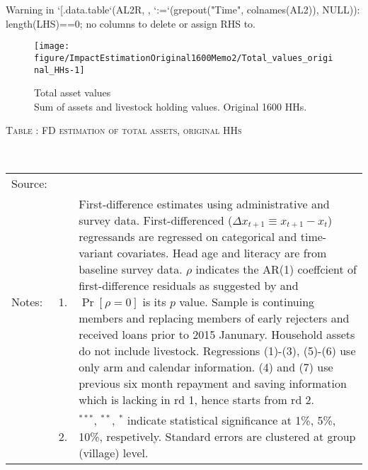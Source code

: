 \begin{Schunk}
\begin{Soutput}
Warning in `[.data.table`(AL2R, , `:=`(grepout("Time", colnames(AL2)), NULL)): length(LHS)==0; no columns to delete or assign RHS to.
\end{Soutput}
\end{Schunk}





\begin{Schunk}
\begin{figure}

{\centering \texttt{[image: figure/ImpactEstimationOriginal1600Memo2/Total\_values\_original\_HHs-1]} 

}

\caption{Total asset values\\ {\footnotesize Sum of assets and livestock holding values. Original 1600 HHs.\setlength{\baselineskip}{8pt}}}\label{Figure Total values original HHs}
\end{figure}
\end{Schunk}


\hspace{-1cm}\begin{minipage}[t]{14cm}
\hfil\textsc{\normalsize Table \thetable: FD estimation of total assets, original HHs\label{tab FD total assets original HHs}}\\
\setlength{\tabcolsep}{1pt}
\setlength{\baselineskip}{8pt}
\renewcommand{\arraystretch}{.55}
\hfil{}\\
\renewcommand{\arraystretch}{.8}
\setlength{\tabcolsep}{1pt}
\begin{tabular}{>{\hfill\scriptsize}p{1cm}<{}>{\hfill\scriptsize}p{.25cm}<{}>{\scriptsize}p{12cm}<{\hfill}}
Source:& \multicolumn{2}{l}{\scriptsize Estimated with GUK administrative and survey data.}\\
Notes: & 1. & First-difference estimates using administrative and survey data. First-differenced ($\Delta x_{t+1}\equiv x_{t+1} - x_{t}$) regressands are regressed on categorical and time-variant covariates. Head age and literacy are from baseline survey data. $\rho$ indicates the AR(1) coeffcient of first-difference residuals as suggested by \citet[][10.71]{Wooldridge2010} and $\Pr[\rho=0]$ is its $p$ value. Sample is continuing members and replacing members of early rejecters and received loans prior to 2015 Janunary. Household assets do not include livestock. Regressions (1)-(3), (5)-(6) use only arm and calendar information. (4) and (7) use previous six month repayment and saving information which is lacking in rd 1, hence starts from rd 2.\\
& 2. & ${}^{***}$, ${}^{**}$, ${}^{*}$ indicate statistical significance at 1\%, 5\%, 10\%, respetively. Standard errors are clustered at group (village) level.
\end{tabular}
\end{minipage}

